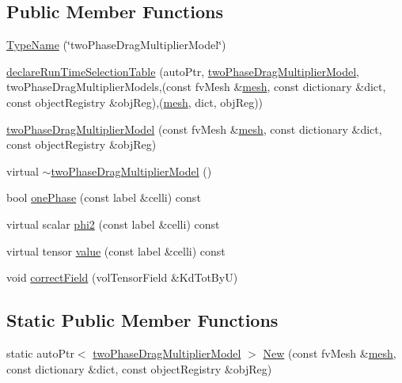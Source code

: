 \subsection*{Public Member Functions}
\begin{DoxyCompactItemize}
\item 
\hyperlink{classFoam_1_1twoPhaseDragMultiplierModel_aaa572b9cc017e1ffe2ee474119282a6a}{Type\+Name} (\char`\"{}two\+Phase\+Drag\+Multiplier\+Model\char`\"{})
\item 
\hyperlink{classFoam_1_1twoPhaseDragMultiplierModel_a63a8414ae76095e1b37aaa1796577c17}{declare\+Run\+Time\+Selection\+Table} (auto\+Ptr, \hyperlink{classFoam_1_1twoPhaseDragMultiplierModel}{two\+Phase\+Drag\+Multiplier\+Model}, two\+Phase\+Drag\+Multiplier\+Models,(const fv\+Mesh \&\hyperlink{createMeshesPostProcess_8H_a8bb1e58291d2d2b653e024a4f4bffe38}{mesh}, const dictionary \&dict, const object\+Registry \&obj\+Reg),(\hyperlink{createMeshesPostProcess_8H_a8bb1e58291d2d2b653e024a4f4bffe38}{mesh}, dict, obj\+Reg))
\item 
\hyperlink{classFoam_1_1twoPhaseDragMultiplierModel_a9963544a42ab3473c1d54b6d724e7a70}{two\+Phase\+Drag\+Multiplier\+Model} (const fv\+Mesh \&\hyperlink{createMeshesPostProcess_8H_a8bb1e58291d2d2b653e024a4f4bffe38}{mesh}, const dictionary \&dict, const object\+Registry \&obj\+Reg)
\item 
virtual \hyperlink{classFoam_1_1twoPhaseDragMultiplierModel_aaba7eb11760d526b0c83cbdcedd5a4cf}{$\sim$two\+Phase\+Drag\+Multiplier\+Model} ()
\item 
bool \hyperlink{classFoam_1_1twoPhaseDragMultiplierModel_a955dec2d0cef4dde417eb620a8d3284d}{one\+Phase} (const label \&celli) const
\item 
virtual scalar \hyperlink{classFoam_1_1twoPhaseDragMultiplierModel_ac166798038690d26eb3585aabaf4dd66}{phi2} (const label \&celli) const
\item 
virtual tensor \hyperlink{classFoam_1_1twoPhaseDragMultiplierModel_a7f1394e2b28394d0a4983ebf322e60cf}{value} (const label \&celli) const
\item 
void \hyperlink{classFoam_1_1twoPhaseDragMultiplierModel_a5780609d963f3d1e715d217791b75c13}{correct\+Field} (vol\+Tensor\+Field \&Kd\+Tot\+ByU)
\end{DoxyCompactItemize}
\subsection*{Static Public Member Functions}
\begin{DoxyCompactItemize}
\item 
static auto\+Ptr$<$ \hyperlink{classFoam_1_1twoPhaseDragMultiplierModel}{two\+Phase\+Drag\+Multiplier\+Model} $>$ \hyperlink{classFoam_1_1twoPhaseDragMultiplierModel_ac558677ecda41d9dd384c18870e3dce4}{New} (const fv\+Mesh \&\hyperlink{createMeshesPostProcess_8H_a8bb1e58291d2d2b653e024a4f4bffe38}{mesh}, const dictionary \&dict, const object\+Registry \&obj\+Reg)
\end{DoxyCompactItemize}

